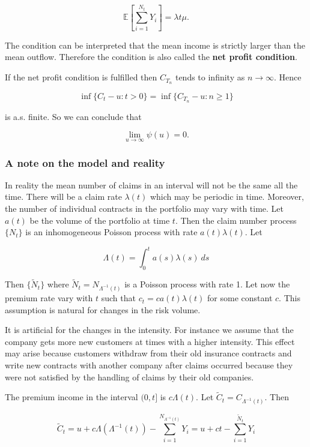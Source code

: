 \documentclass[a4paper,12pt,openany]{book}
\begin{document}
\[
\mathbb E\left[\sum_{i=1}^{N_t}Y_i \right]=\lambda t\mu.
\]

The condition can be interpreted that the mean income is strictly larger than the mean outflow. Therefore the condition is also called the \textbf{net profit condition}.

If the net profit condition is fulfilled then \(C_{T_n}\) tends to infinity as \(n \to\infty\). Hence

\[
\inf\{C_t-u : t>0\}=\inf \{C_{T_n}-u : n\ge 1\}
\]

is a.s. finite. So we can conclude that

\[
\lim_{u\to\infty}\psi(u)=0.
\]

\hypertarget{a-note-on-the-model-and-reality}{%
\subsubsection{A note on the model and reality}\label{a-note-on-the-model-and-reality}}

In reality the mean number of claims in an interval will not be the same all the time. There will be a claim rate \(\lambda(t)\) which may be periodic in time. Moreover, the number of individual contracts in the portfolio may vary with time. Let \(a(t)\) be the volume of the portfolio at time \(t\). Then the claim number process \(\{N_t\}\) is an inhomogeneous Poisson process with rate \(a(t)\lambda(t)\). Let

\[
\Lambda (t)=\int_0^t a(s)\lambda(s)\ ds
\]

Then \(\{\tilde N_t\}\) where \(\tilde N_t = N_{\Lambda^{−1}(t)}\) is a Poisson process with rate 1. Let now the premium rate vary with \(t\) such that \(c_t = ca(t)\lambda(t)\) for some constant \(c\). This assumption is natural for changes in the risk volume.

It is artificial for the changes in the intensity. For instance we assume that the company gets more new customers at times with a higher intensity. This effect may arise because customers withdraw from their old insurance contracts and write new contracts with another company after claims occurred because they were not satisfied by the handling of claims by their old companies.

The premium income in the interval \((0,t]\) is \(c\Lambda(t)\). Let \(\tilde C_t = C_{\Lambda^{−1}(t)}\). Then

\[
\tilde C_t=u+c\Lambda(\Lambda^{-1}(t))-\sum_{i=1}^{N_{\Lambda^{-1}(t)}}Y_i=u+ct-\sum_{i=1}^{\tilde N_t}Y_i
\]
\end{document}
